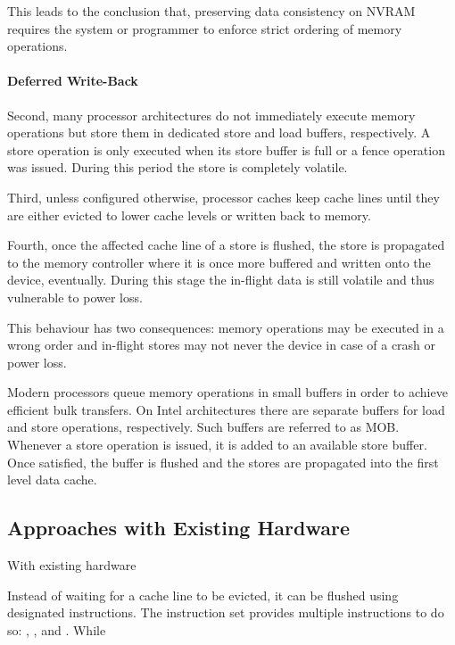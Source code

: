 This leads to the conclusion that, preserving data consistency on \ac{NVRAM} requires the system or programmer to enforce strict ordering of memory operations.

\paragraph{Deferred Write-Back}


Second, many processor architectures do not immediately execute memory
operations but store them in dedicated store and load buffers, respectively. A
store operation is only executed when its store buffer is full or a fence
operation was issued. During this period the store is completely volatile.

Third, unless configured otherwise, processor caches keep cache lines until they
are either evicted to lower cache levels or written back to memory.

Fourth, once the affected cache line of a store is flushed, the store is
propagated to the memory controller where it is once more buffered and written
onto the device, eventually. During this stage the in-flight data is still
volatile and thus vulnerable to power loss.

This behaviour has two consequences: memory operations may be executed in a
wrong order and in-flight stores may not never the device in case of a crash
or power loss.

Modern processors queue memory operations in small buffers in order to achieve
efficient bulk transfers. On Intel  architectures there are separate
buffers for load and store operations, respectively. Such buffers are referred
to as \ac{MOB}. Whenever a store operation is issued, it is added to an
available store buffer. Once satisfied, the buffer is flushed and the stores are
propagated into the first level data cache.

\subsection{Approaches with Existing Hardware}

With existing hardware


Instead of waiting for a cache line to be evicted, it can be flushed using
designated instructions. The  instruction set provides multiple
instructions to do so: , , and .
While 

